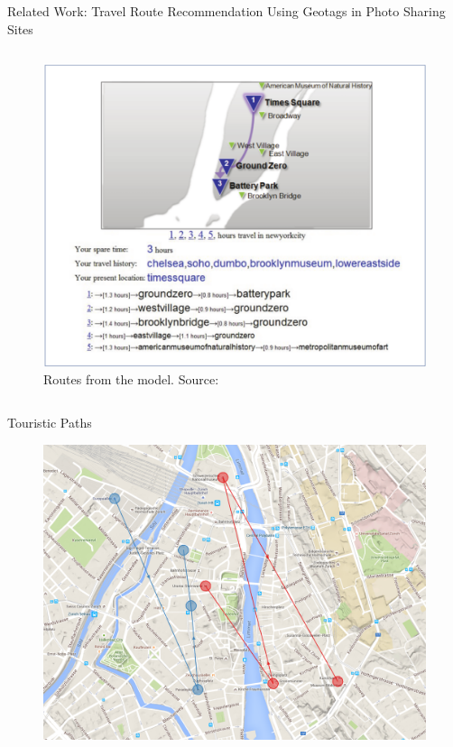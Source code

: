 \documentclass{beamer}
\begin{document}
\begin{frame}{Related Work: Travel Route Recommendation Using Geotags in Photo Sharing Sites}
\begin{columns}
\begin{column}{0.3\textwidth}
      \begin{figure}
        \centering
        \includegraphics[width=\textwidth]{kurashima2}
        \caption{Routes from the model. {\tiny Source: \citet{Kurashima2010}}}
      \end{figure}
    \end{column}
  \end{columns}
\end{frame}

\begin{frame}{Touristic Paths}
  \begin{figure}
    \centering
    \includegraphics[scale=0.22]{routes_1}
  \end{figure}
\end{frame}
\end{document}
